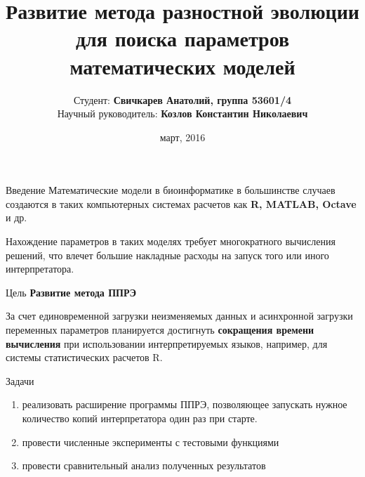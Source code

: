 \documentclass{beamer}
\begin{document}
\title[Развитие ППРЭ]
{Развитие метода разностной эволюции
для поиска параметров математических моделей}
\author[Свичкарев Анатолий]
{Студент: \textbf{Свичкарев Анатолий, группа 53601/4}\\
Научный руководитель: \textbf{Козлов Константин Николаевич}}
\date{март, 2016}

\frame{\titlepage} 

\begin{frame}{Введение}
Математические модели в биоинформатике в
большинстве случаев создаются в таких компьютерных
системах расчетов как \textbf{R, MATLAB, Octave} и др.
\bigskip

Нахождение параметров в таких моделях требует
многократного вычисления решений, что влечет
большие накладные расходы на запуск того или иного
интерпретатора.
\end{frame}

\begin{frame}{Цель}
\textbf{Развитие метода ППРЭ}

\bigskip
За счет единовременной загрузки
неизменяемых данных и
асинхронной загрузки переменных параметров
планируется достигнуть
\textbf{сокращения времени вычисления}
при использовании
интерпретируемых языков, например,
для системы статистических расчетов R.
\end{frame}

\begin{frame}{Задачи}
\begin{enumerate}
    \itemsep 2em
    \item реализовать расширение программы ППРЭ,
        позволяющее запускать нужное количество копий
        интерпретатора один раз при старте.
    \item провести численные эксперименты с тестовыми функциями
    \item провести сравнительный анализ полученных результатов
\end{enumerate}
\end{frame}
\end{document}
